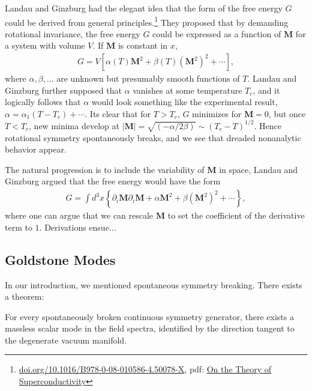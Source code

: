 \documentclass[10pt,twoside]{report}
\numberwithin{equation}{chapter}
\begin{document}
Landau and Ginzburg had the elegant idea that the form of the free energy $G$ could be derived from general principles.\footnote{\href{https://doi.org/10.1016/B978-0-08-010586-4.50078-X}{doi.org/10.1016/B978-0-08-010586-4.50078-X}, pdf: \href{https://tinyurl.com/landauGinzburg}{On the Theory of Superconductivity}}  They proposed that by demanding rotational invariance, the free energy $G$ could be expressed as a function of $\bm{M}$ for a system with volume $V$.  If $\bm{M}$ is constant in $x$, 
\begin{align}
  G = V \left[ \alpha(T)\bm{M}^{2}+\beta(T)\left( \bm{M}^{2} \right)^{2} + \cdots \right],
\end{align}
where $\alpha, \beta, \dots$ are unknown but presumably smooth functions of $T$.  Landau and Ginzburg further supposed that $\alpha$ vanishes at some temperature $T_{c}$, and it logically follows that $\alpha$ would look something like the experimental result, $\alpha = \alpha_{1}(T-T_{c})+\cdots$.  Its clear that for $T>T_{c}$, $G$ minimizes for $\bm{M}=0$, but once $T<T_{c}$, new minima develop at $|\bm{M}| = \sqrt{(-\alpha/2\beta)}\sim (T_{c}-T)^{1/2}$.  Hence rotational symmetry spontaneously breaks, and we see that dreaded nonanalytic behavior appear.

The natural progression is to include the variability of $\bm{M}$ in space, Landau and Ginzburg argued that the free energy would have the form
\begin{align}
  G = \int d^{3}x \left\{ \partial_{i}\bm{M}\partial_{i}\bm{M} + \alpha \bm{M}^{2} + \beta \left( \bm{M}^{2} \right)^{2} + \cdots \right\},
\end{align}
where one can argue that we can rescale $\bm{M}$ to set the coefficient of the derivative term to $1$.  Derivations ensue...

\subsection{Goldstone Modes}

In our introduction, we mentioned spontaneous symmetry breaking.  There exists a theorem: 
\begin{theorem}
  For every spontaneously broken continuous symmetry generator, there exists a massless scalar mode in the field spectra, identified by the direction tangent to the degenerate vacuum manifold.
\end{theorem}
\end{document}
